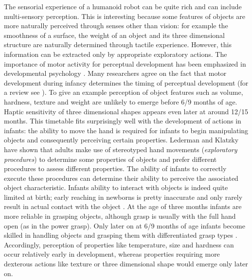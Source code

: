 The sensorial experience of a humanoid robot can be quite rich and can include multi-sensory perception. This is interesting because some features of objects are more naturally perceived through senses other than vision: for example the smoothness of a surface, the weight of an object and its three dimensional structure are naturally determined through tactile experience. However, this information can be extracted only by appropriate exploratory actions.
The importance of motor activity for perceptual development has been emphasized in developmental psychology \cite{hofsten04motor,gibson88explore}. Many researchers agree on the fact that motor development during infancy determines the timing of perceptual development (for a review see \cite{bushnell93motor}). To give an example perception of object features such as volume, hardness, texture and weight are unlikely to emerge before 6/9 months of age. Haptic sensitivity of three dimensional shapes appears even later at around 12/15 months. This timetable fits surprisingly well with the development of actions in infants: the ability to move the hand is required for infants to begin manipulating objects and consequently perceiving certain properties. Lederman and Klatzky \cite{lederman87hand} have shown that adults make use of stereotyped hand movements (\emph{exploratory procedures}) to determine some properties of objects and prefer different procedures to assess different properties. The ability of infants to correctly execute these procedures can determine their ability to perceive the associated object characteristic. 
Infants ability to interact with objects is indeed quite limited at birth; early reaching in newborns is pretty inaccurate and only rarely result in actual contact with the object \cite{hofsten82eye-hand}. At the age of three months infants are more reliable in grasping objects, although grasp is usually with the full hand open (as in the power grasp). Only later on at 6/9 months of age infants become skilled in handling objects and grasping them with differentiated grasp types \cite{hofsten93thestructuring}. Accordingly, perception of properties like temperature, size and hardness can occur relatively early in development, whereas properties requiring more dexterous actions like texture or three dimensional shape would emerge only later on.

